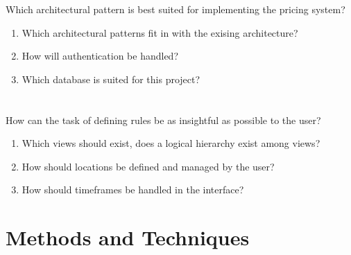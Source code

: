Which architectural pattern is best suited for implementing the pricing system?
\begin{enumerate}
    \item Which architectural patterns fit in with the exising architecture?
    \item How will authentication be handled?
    \item Which database is suited for this project?
\end{enumerate}


\section{}

How can the task of defining rules be as insightful as possible to the user?
\begin{enumerate}
    \item Which views should exist, does a logical hierarchy exist among views?
    \item How should locations be defined and managed by the user?
    \item How should timeframes be handled in the interface?
\end{enumerate}

\section{Methods and Techniques}